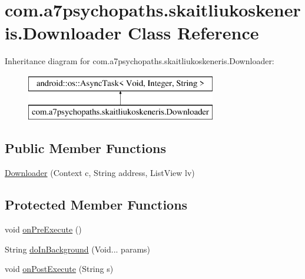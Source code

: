 \hypertarget{classcom_1_1a7psychopaths_1_1skaitliukoskeneris_1_1_downloader}{}\section{com.\+a7psychopaths.\+skaitliukoskeneris.\+Downloader Class Reference}
\label{classcom_1_1a7psychopaths_1_1skaitliukoskeneris_1_1_downloader}
Inheritance diagram for com.\+a7psychopaths.\+skaitliukoskeneris.\+Downloader\+:\begin{figure}[H]
\begin{center}
\leavevmode
\includegraphics[height=2.000000cm]{classcom_1_1a7psychopaths_1_1skaitliukoskeneris_1_1_downloader}
\end{center}
\end{figure}
\subsection*{Public Member Functions}
\begin{DoxyCompactItemize}
\item 
\mbox{\hyperlink{classcom_1_1a7psychopaths_1_1skaitliukoskeneris_1_1_downloader_ac30990a6ffcbddcc9697ba2c13e55760}{Downloader}} (Context c, String address, List\+View lv)
\end{DoxyCompactItemize}
\subsection*{Protected Member Functions}
\begin{DoxyCompactItemize}
\item 
void \mbox{\hyperlink{classcom_1_1a7psychopaths_1_1skaitliukoskeneris_1_1_downloader_abb5feb7a0a9662c4381d209152ee2e6d}{on\+Pre\+Execute}} ()
\item 
String \mbox{\hyperlink{classcom_1_1a7psychopaths_1_1skaitliukoskeneris_1_1_downloader_a5bbe9eafdce2e099eab793dc51179408}{do\+In\+Background}} (Void... params)
\item 
void \mbox{\hyperlink{classcom_1_1a7psychopaths_1_1skaitliukoskeneris_1_1_downloader_aeb48e16283a0f0003254adfeb80faecf}{on\+Post\+Execute}} (String s)
\end{DoxyCompactItemize}


